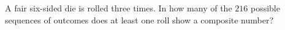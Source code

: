A fair six-sided die is rolled three times. In how many of the $216$ possible sequences of outcomes does at least one roll show a composite number?
